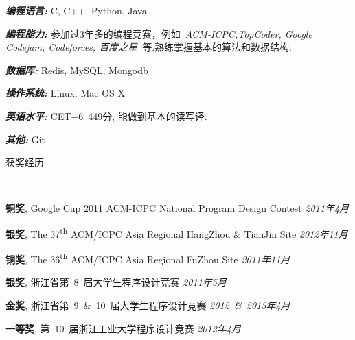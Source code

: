 ﻿\documentclass[9pt]{article}
\newenvironment{changemargin}[2]{%
  \begin{list}{}{%
    \setlength{\topsep}{0pt}%
    \setlength{\leftmargin}{#1}%
    \setlength{\rightmargin}{#2}%
    \setlength{\listparindent}{\parindent}%
    \setlength{\itemindent}{\parindent}%
    \setlength{\parsep}{\parskip}%
  }%
  \item[]}{\end{list}
}
\newcommand{\lineover}{
	\begin{changemargin}{-0.05in}{-0.05in}
		\vspace*{-8pt}
		\hrulefill \\
		\vspace*{-2pt}
	\end{changemargin}
}
\newcommand{\header}[1]{
	\begin{changemargin}{-0.5in}{-0.5in}
		\scshape{#1}\\
  	\lineover
	\end{changemargin}
}
\newenvironment{body} {
	\vspace*{-16pt}
	\begin{changemargin}{-0.25in}{-0.5in}
  }	
	{\end{changemargin}
}
\newcommand\nth{\textsuperscript{th}} %
\begin{document}
\begin{body}
	\vspace{14pt}
	\emph{\textbf{编程语言:}}{} C, C++, Python, Java \\
	\medskip

    \emph{\textbf{编程能力:}}{} 参加过3年多的编程竞赛，例如~\emph{ACM-ICPC,TopCoder, Google Codejam, Codeforces, 百度之星}~等.熟练掌握基本的算法和数据结构.\\
	\medskip

    \emph{\textbf{数据库:}}{} Redis, MySQL, Mongodb \\
    \medskip

	\emph{\textbf{操作系统:}}{} Linux, Mac OS X\\
    \medskip

    \emph{\textbf{英语水平:}}{} CET$-$6~449分, 能做到基本的读写译.\\
    \medskip

    \emph{\textbf{其他:}}{} Git\\

\end{body}

\smallskip

\header{获奖经历}

\begin{body}
	\vspace{14pt}

	\textbf{铜奖}, Google Cup 2011 ACM-ICPC National Program Design Contest \hfill{} \emph{2011年4月}\\
	\smallskip

	\textbf{银奖}, The 37\nth{} ACM/ICPC Asia Regional HangZhou \& TianJin Site \hfill{} \emph{2012年11月}\\
	\smallskip

	\textbf{铜奖}, The 36\nth{} ACM/ICPC Asia Regional FuZhou Site \hfill{} \emph{2011年11月}\\
	\smallskip

	\textbf{银奖}, 浙江省第~8~届大学生程序设计竞赛 \hfill{} \emph{2011年5月}\\
	\smallskip

	\textbf{金奖}, 浙江省第~9~\&~10~届大学生程序设计竞赛 \hfill{} \emph{2012~\&~2013年4月}\\
	\smallskip

	\textbf{一等奖}, 第~10~届浙江工业大学程序设计竞赛 \hfill{} \emph{2012年4月}\\
\end{body}
\end{document}
